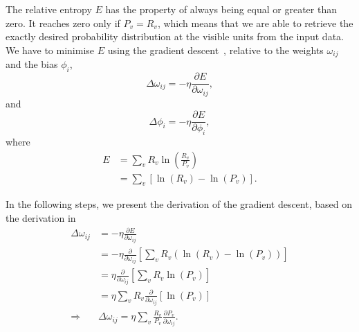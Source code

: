 The relative entropy $E$ has the property of always being equal or greater than zero. 
It reaches zero only if $P_{v} = R_{v}$, which means that we are able to retrieve the exactly desired probability distribution at the visible units from the input data. 
We have to minimise $E$ using the gradient descent~\cite{bib:hertz1991}, relative to the weights $\omega_{ij}$ and the bias $\phi_{i}$, 
\begin{equation}
  \label{eq:delta-omega}
  \Delta \omega_{ij} = -\eta \frac{\partial E}{\partial \omega_{ij}},
\end{equation}
and
\begin{equation}
  \label{eq:delta-phi}
  \Delta \phi_{i} = -\eta \frac{\partial E}{\partial \phi_{i}},
\end{equation}
where
\begin{equation}
  \label{eq:relative-entropy-expansion}
  \begin{split}
    E & = \sum_{v} R_{v} \ln{\left(\frac{R_{v}}{P_{v}}\right)} \\
      & = \sum_{v} \left[ \ln{(R_{v})} - \ln{(P_{v})} \right].
  \end{split}
\end{equation}

In the following steps, we present the derivation of the gradient descent, based on the derivation in~\cite{bib:hertz1991}
\begin{equation}
  \label{eq:relative-entropy-grad-step1}
  \begin{split}
    \Delta \omega_{ij} & = - \eta \frac{\partial E}{\partial \omega_{ij}} \\
                  & = - \eta \frac{\partial}{\partial \omega_{ij}} \left[ \sum_{v} R_{v} \left( \ln{(R_{v})} - \ln{(P_{v})} \right) \right] \\
                  & = \eta \frac{\partial}{\partial \omega_{ij}} \left[ \sum_{v} R_{v} \ln{(P_{v})} \right] \\
                  & = \eta \sum_{v} R_{v} \frac{\partial}{\partial \omega_{ij}} \left[ \ln{(P_{v})} \right] \\
                  \Rightarrow & \Delta \omega_{ij} = \eta \sum_{v} \frac{R_{v}}{P_{v}} \frac{\partial P_{v}}{\partial \omega_{ij}}.
  \end{split}
\end{equation}

